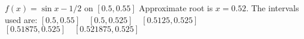 {$f(x) = \sin x - 1/2$ on $[0.5,0.55]$
}
{Approximate root is $x=0.52$. The intervals used are:
$[0.5,0.55] \quad [0.5,0.525] \quad [0.5125,0.525]$
$[0.51875,0.525]\quad [0.521875,0.525]$
}
